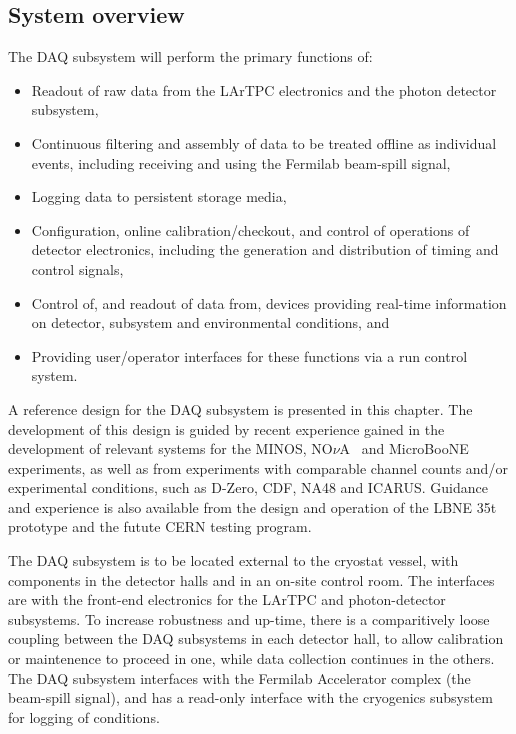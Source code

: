 \subsection{System overview} 

The DAQ subsystem will perform the primary functions of:

\begin{itemize}
  \item Readout of raw data from the LArTPC electronics and the photon
    detector subsystem,

  \item Continuous filtering and assembly of data to be treated
    offline as individual events, including receiving and using the
    Fermilab beam-spill signal, 

  \item Logging data to persistent storage media,

  \item Configuration, online calibration/checkout, and control of 
        operations of detector electronics, including the generation 
        and distribution of timing and control signals,

  \item Control of, and readout of data from, devices 
        providing real-time information on detector, subsystem 
        and environmental conditions, and  

  \item Providing user/operator interfaces for these functions via 
        a run control system.
\end{itemize}

A reference design for the DAQ subsystem is presented in this chapter.
The development of this design is guided by recent experience gained
in the development of relevant systems for the MINOS,
NO$\nu$A~\cite{novatdr} and MicroBooNE~\cite{microboonecdr}
experiments, as well as from experiments with comparable channel
counts and/or experimental conditions, such as D-Zero, CDF, NA48 and
ICARUS.  Guidance and experience is also available from the design and
operation of the LBNE 35t prototype and the futute CERN testing
program.

The DAQ subsystem is to be located external to the cryostat vessel,
with components in the detector halls and in an on-site control
room.
The interfaces are with the front-end electronics for the LArTPC and
photon-detector subsystems.  To increase robustness and up-time, there
is a comparitively loose coupling between the DAQ subsystems in each
detector hall, to allow calibration or maintenence to proceed in one,
while data collection continues in the others.  The DAQ subsystem
interfaces with the Fermilab Accelerator complex (the beam-spill
signal), and has a read-only interface with the cryogenics subsystem
for logging of conditions.  


